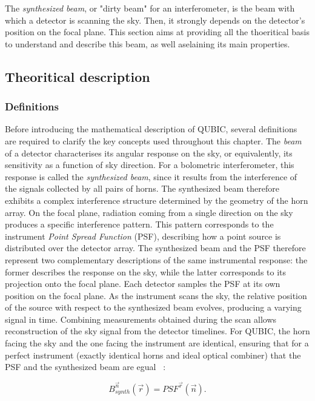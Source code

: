 \documentclass[../../thesis.tex]{subfiles}
\begin{document}
The \emph{synthesized beam}, or "dirty beam" for an interferometer, is the beam with which a detector is scanning the sky. Then, it strongly depends on the detector's position on the focal plane. This section aims at providing all the thoeritical basis to understand and describe this beam, as well aselaining its main properties.

\subsection{Theoritical description}

\subsubsection{Definitions}

Before introducing the mathematical description of QUBIC, several definitions are required to clarify the key concepts used throughout this chapter.
The \emph{beam} of a detector characterises its angular response on the sky, or equivalently, its sensitivity as a function of sky direction. For a bolometric interferometer, this response is called the \emph{synthesized beam}, since it results from the interference of the signals collected by all pairs of horns. The synthesized beam therefore exhibits a complex interference structure determined by the geometry of the horn array.
On the focal plane, radiation coming from a single direction on the sky produces a specific interference pattern. This pattern corresponds to the instrument \emph{Point Spread Function} (PSF), describing how a point source is distributed over the detector array. The synthesized beam and the PSF therefore represent two complementary descriptions of the same instrumental response: the former describes the response on the sky, while the latter corresponds to its projection onto the focal plane.
Each detector samples the PSF at its own position on the focal plane. As the instrument scans the sky, the relative position of the source with respect to the synthesized beam evolves, producing a varying signal in time. Combining measurements obtained during the scan allows reconstruction of the sky signal from the detector timelines.
For QUBIC, the horn facing the sky and the one facing the instrument are identical, ensuring that for a perfect instrument (exactly identical horns and ideal optical combiner) that the PSF and the synthesized beam are egual~\cite{QUBICVIII} : 

\begin{equation} \label{eq:synth_beam}
    B_{synth}^{\vec{n}}(\vec{r}) = PSF^{\vec{r}}(\vec{n}).
\end{equation}
\end{document}
